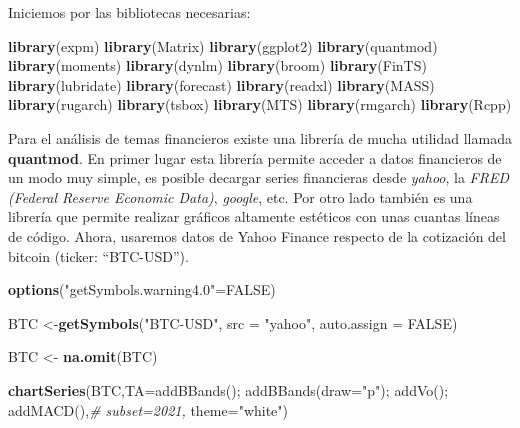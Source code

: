 \documentclass[
]{book}
\newenvironment{Shaded}{\begin{snugshade}}{\end{snugshade}}
\newcommand{\AttributeTok}[1]{\textcolor[rgb]{0.13,0.29,0.53}{#1}}
\newcommand{\CommentTok}[1]{\textcolor[rgb]{0.56,0.35,0.01}{\textit{#1}}}
\newcommand{\ConstantTok}[1]{\textcolor[rgb]{0.56,0.35,0.01}{#1}}
\newcommand{\FunctionTok}[1]{\textcolor[rgb]{0.13,0.29,0.53}{\textbf{#1}}}
\newcommand{\NormalTok}[1]{#1}
\newcommand{\OtherTok}[1]{\textcolor[rgb]{0.56,0.35,0.01}{#1}}
\newcommand{\StringTok}[1]{\textcolor[rgb]{0.31,0.60,0.02}{#1}}
\begin{document}
Iniciemos por las bibliotecas necesarias:

\begin{Shaded}
\begin{Highlighting}[]
\FunctionTok{library}\NormalTok{(expm)}
\FunctionTok{library}\NormalTok{(Matrix)}
\FunctionTok{library}\NormalTok{(ggplot2)}
\FunctionTok{library}\NormalTok{(quantmod)}
\FunctionTok{library}\NormalTok{(moments)}
\FunctionTok{library}\NormalTok{(dynlm)}
\FunctionTok{library}\NormalTok{(broom)}
\FunctionTok{library}\NormalTok{(FinTS)}
\FunctionTok{library}\NormalTok{(lubridate)}
\FunctionTok{library}\NormalTok{(forecast)}
\FunctionTok{library}\NormalTok{(readxl)}
\FunctionTok{library}\NormalTok{(MASS)}
\FunctionTok{library}\NormalTok{(rugarch)}
\FunctionTok{library}\NormalTok{(tsbox)}
\FunctionTok{library}\NormalTok{(MTS)}
\FunctionTok{library}\NormalTok{(rmgarch)}
\FunctionTok{library}\NormalTok{(Rcpp)}
\end{Highlighting}
\end{Shaded}

Para el análisis de temas financieros existe una librería de mucha utilidad llamada \textbf{quantmod}. En primer lugar esta librería permite acceder a datos financieros de un modo muy simple, es posible decargar series financieras desde \emph{yahoo}, la \emph{FRED (Federal Reserve Economic Data)}, \emph{google}, etc. Por otro lado también es una librería que permite realizar gráficos altamente estéticos con unas cuantas líneas de código. Ahora, usaremos datos de Yahoo Finance respecto de la cotización del bitcoin (ticker: ``BTC-USD'').

\begin{Shaded}
\begin{Highlighting}[]
\FunctionTok{options}\NormalTok{(}\StringTok{"getSymbols.warning4.0"}\OtherTok{=}\ConstantTok{FALSE}\NormalTok{)}

\NormalTok{BTC }\OtherTok{\textless{}{-}}\FunctionTok{getSymbols}\NormalTok{(}\StringTok{"BTC{-}USD"}\NormalTok{, }\AttributeTok{src =} \StringTok{"yahoo"}\NormalTok{, }\AttributeTok{auto.assign =} \ConstantTok{FALSE}\NormalTok{)}

\NormalTok{BTC }\OtherTok{\textless{}{-}} \FunctionTok{na.omit}\NormalTok{(BTC)}

\FunctionTok{chartSeries}\NormalTok{(BTC,}\AttributeTok{TA=}\StringTok{\textquotesingle{}addBBands();}
\StringTok{                    addBBands(draw="p");}
\StringTok{                    addVo();}
\StringTok{                    addMACD()\textquotesingle{}}\NormalTok{,}\CommentTok{\# subset=\textquotesingle{}2021\textquotesingle{},}
                \AttributeTok{theme=}\StringTok{"white"}\NormalTok{)}
\end{Highlighting}
\end{Shaded}
\end{document}

